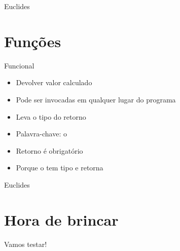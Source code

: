 \documentclass[14pt]{beamer}
\begin{document}
		\begin{frame}{Euclides}
			\presentationPause
		\end{frame}


	\section{Funções}
		\begin{frame}{Funcional}
			\begin{itemize}
				\presentationPause\item Devolver valor calculado
				\presentationPause\item Pode ser invocadas em qualquer lugar do programa
				\presentationPause\item Leva o tipo do retorno
				\presentationPause\item Palavra-chave: \presentationPause o 
				\presentationPause\item Retorno é obrigatório
				\presentationPause\item Porque o  tem tipo  e retorna 
			\end{itemize}
			\presentationPause
		\end{frame}

		\begin{frame}{Euclides}
			\presentationPause
		\end{frame}


	\section{Hora de brincar}
		\begin{frame}
			\begin{center}\Huge
				Vamos testar!
			\end{center}
		\end{frame}
\end{document}
